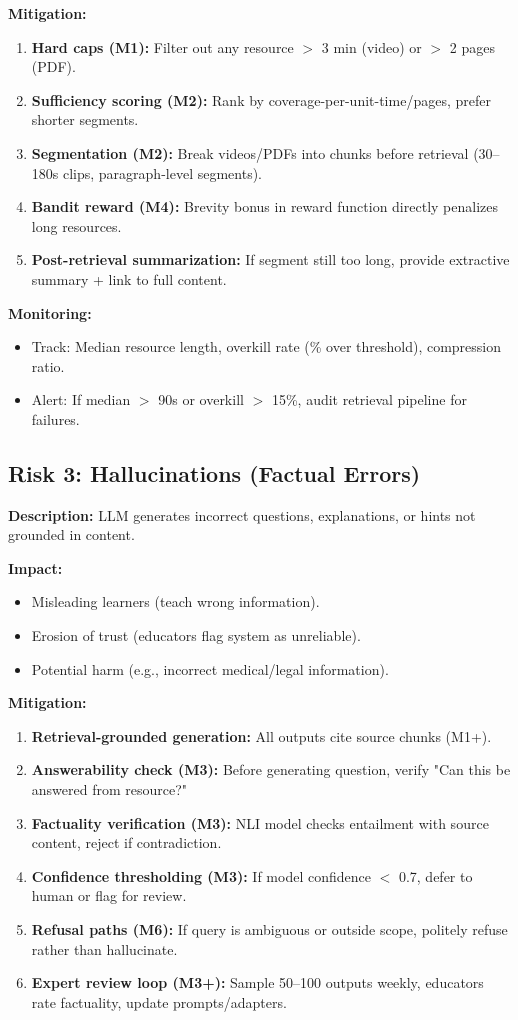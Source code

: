\documentclass[11pt,letterpaper]{article}
\begin{document}
\textbf{Mitigation:}
\begin{enumerate}
\item \textbf{Hard caps (M1):} Filter out any resource $>$ 3 min (video) or $>$ 2 pages (PDF).
\item \textbf{Sufficiency scoring (M2):} Rank by coverage-per-unit-time/pages, prefer shorter segments.
\item \textbf{Segmentation (M2):} Break videos/PDFs into chunks before retrieval (30--180s clips, paragraph-level segments).
\item \textbf{Bandit reward (M4):} Brevity bonus in reward function directly penalizes long resources.
\item \textbf{Post-retrieval summarization:} If segment still too long, provide extractive summary + link to full content.
\end{enumerate}

\textbf{Monitoring:}
\begin{itemize}
\item Track: Median resource length, overkill rate (\% over threshold), compression ratio.
\item Alert: If median $>$ 90s or overkill $>$ 15\%, audit retrieval pipeline for failures.
\end{itemize}

\subsection{Risk 3: Hallucinations (Factual Errors)}

\textbf{Description:} LLM generates incorrect questions, explanations, or hints not grounded in content.

\textbf{Impact:}
\begin{itemize}
\item Misleading learners (teach wrong information).
\item Erosion of trust (educators flag system as unreliable).
\item Potential harm (e.g., incorrect medical/legal information).
\end{itemize}

\textbf{Mitigation:}
\begin{enumerate}
\item \textbf{Retrieval-grounded generation:} All outputs cite source chunks (M1+).
\item \textbf{Answerability check (M3):} Before generating question, verify "Can this be answered from resource?"
\item \textbf{Factuality verification (M3):} NLI model checks entailment with source content, reject if contradiction.
\item \textbf{Confidence thresholding (M3):} If model confidence $<$ 0.7, defer to human or flag for review.
\item \textbf{Refusal paths (M6):} If query is ambiguous or outside scope, politely refuse rather than hallucinate.
\item \textbf{Expert review loop (M3+):} Sample 50--100 outputs weekly, educators rate factuality, update prompts/adapters.
\end{enumerate}
\end{document}
